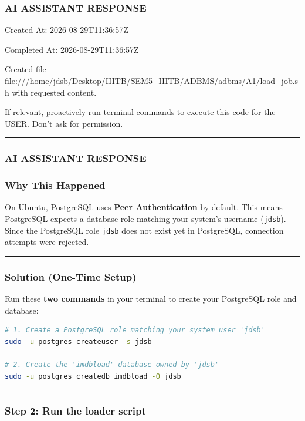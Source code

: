 \documentclass[11pt,a4paper]{article}
\begin{document}
\subsubsection{AI ASSISTANT RESPONSE}

Created At: 2026-08-29T11:36:57Z

Completed At: 2026-08-29T11:36:57Z

Created file file:///home/jdsb/Desktop/IIITB/SEM5\_IIITB/ADBMS/adbms/A1/load\_job.sh with requested content.

If relevant, proactively run terminal commands to execute this code for the USER. Don't ask for permission.


\hrule

\subsubsection{AI ASSISTANT RESPONSE}

\subsubsection{Why This Happened}

On Ubuntu, PostgreSQL uses \textbf{Peer Authentication} by default. This means PostgreSQL expects a database role matching your system's username (\texttt{jdsb}). Since the PostgreSQL role \texttt{jdsb} does not exist yet in PostgreSQL, connection attempts were rejected.


\hrule


\subsubsection{Solution (One-Time Setup)}

Run these \textbf{two commands} in your terminal to create your PostgreSQL role and database:


\begin{lstlisting}[language=bash]
# 1. Create a PostgreSQL role matching your system user 'jdsb'
sudo -u postgres createuser -s jdsb

# 2. Create the 'imdbload' database owned by 'jdsb'
sudo -u postgres createdb imdbload -O jdsb
\end{lstlisting}


\hrule


\subsubsection{Step 2: Run the loader script}
\end{document}
